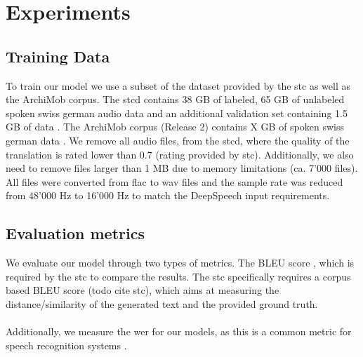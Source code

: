 \section{Experiments}

\subsection{Training Data}
To train our model we use a subset of the dataset provided by the \gls{stc} as well as the ArchiMob corpus. The \gls{stcd} contains 38 GB of labeled, 65 GB of unlabeled spoken swiss german audio data and an additional validation set
containing 1.5 GB of data \cite{stc2019}. The ArchiMob corpus (Release 2) contains X GB of spoken swiss german data \cite{archimob2016}. We remove all audio files, from the \gls{stcd}, where the quality of the translation
is rated lower than 0.7 (rating provided by \gls{stc}). Additionally, we also need to remove files larger than 1 MB due to memory limitations (ca. 7'000 files). All files were converted from flac to wav files and the sample rate was reduced from 48'000 Hz to 16'000 Hz to match the DeepSpeech input requirements.

\subsection{Evaluation metrics}
We evaluate our model through two types of metrics. The BLEU score \cite{Papineni2002BleuAM}, which is required by the \gls{stc} to compare the results. The \gls{stc} specifically requires a corpus
based BLEU score (todo cite stc), which aims at measuring the distance/similarity of the generated text and the provided ground truth.\\~\\Additionally, we measure the \gls{wer} for our models, as
this is a common metric for speech recognition systems \cite{Park2008AnEA}.



